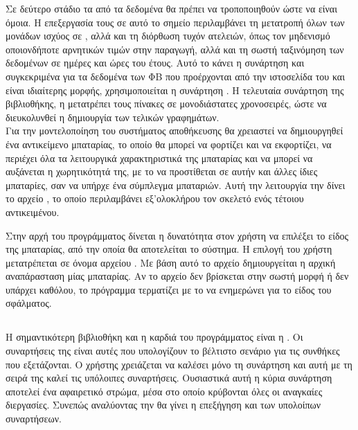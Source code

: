 \documentclass[12pt]{report}
\begin{document}
Σε δεύτερο στάδιο τα {} από τα δεδομένα θα πρέπει να τροποποιηθούν ώστε να είναι όμοια. Η επεξεργασία τους σε αυτό το σημείο περιλαμβάνει τη μετατροπή όλων των μονάδων ισχύος σε {}, αλλά και 
τη διόρθωση τυχόν ατελειών, όπως τον μηδενισμό οποιονδήποτε αρνητικών τιμών στην παραγωγή, αλλά και τη σωστή ταξινόμηση των δεδομένων σε ημέρες και ώρες του έτους. Αυτό το κάνει η συνάρτηση {\textbf{{}}} και 
συγκεκριμένα για τα δεδομένα των ΦΒ που προέρχονται από την ιστοσελίδα του {} και είναι ιδιαίτερης μορφής, χρησιμοποιείται η συνάρτηση {\textbf{{}}}. Η τελευταία συνάρτηση της βιβλιοθήκης, η 
{\textbf{{}}} μετατρέπει τους πίνακες σε μονοδιάστατες χρονοσειρές, ώστε να διευκολυνθεί η δημιουργία των τελικών γραφημάτων.
\\ [30pt]

Για την μοντελοποίηση του συστήματος αποθήκευσης θα χρειαστεί να δημιουργηθεί ένα αντικείμενο μπαταρίας, το οποίο θα μπορεί να φορτίζει και να εκφορτίζει, να περιέχει όλα τα λειτουργικά χαρακτηριστικά της μπαταρίας και να μπορεί να 
αυξάνεται η χωρητικότητά της, με το να προστίθεται σε αυτήν και άλλες ίδιες μπαταρίες, σαν να υπήρχε ένα σύμπλεγμα μπαταριών. Αυτή την λειτουργία την δίνει το αρχείο {}, το οποίο περιλαμβάνει εξ'ολοκλήρου 
τον σκελετό ενός τέτοιου αντικειμένου. 

Στην αρχή του προγράμματος δίνεται η δυνατότητα στον χρήστη να επιλέξει το είδος της μπαταρίας, από την οποία θα αποτελείται το σύστημα. Η επιλογή του χρήστη μετατρέπεται σε όνομα αρχείου {}. Με βάση αυτό το αρχείο 
δημιουργείται η αρχική αναπάρασταση μίας μπαταρίας. Αν το αρχείο δεν βρίσκεται στην σωστή μορφή ή δεν υπάρχει καθόλου, το πρόγραμμα τερματίζει με το να ενημερώνει για το είδος του σφάλματος.

\subsection{{}}
Η σημαντικότερη βιβλιοθήκη και η καρδιά του προγράμματος είναι η {}. Οι συναρτήσεις της είναι αυτές που υπολογίζουν το βέλτιστο σενάριο για τις συνθήκες που εξετάζονται. Ο χρήστης χρειάζεται να καλέσει μόνο
τη συνάρτηση {\textbf{{}}} και αυτή με τη σειρά της καλεί τις υπόλοιπες συναρτήσεις. Ουσιαστικά αυτή η κύρια συνάρτηση αποτελεί ένα αφαιρετικό στρώμα, μέσα στο οποίο κρύβονται όλες οι αναγκαίες 
διεργασίες. Συνεπώς αναλύοντας την {\textbf{{}}} θα γίνει η επεξήγηση και των υπολοίπων συναρτήσεων.
\end{document}
